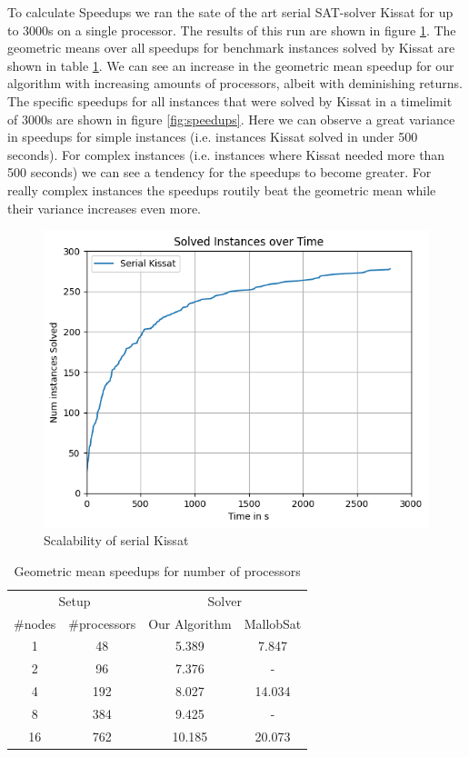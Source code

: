 \documentclass[12pt,a4paper,twoside]{scrartcl}
\numberwithin{equation}{section}
\begin{document}
To calculate Speedups we ran the sate of the art serial SAT-solver Kissat for up to 3000s on a single processor. The results of this run are shown in figure \ref{fig:runtimeSerial}. The geometric means over all speedups for benchmark instances solved by Kissat are shown in table \ref{tab:speedups}. We can see an increase in the geometric mean speedup for our algorithm with increasing amounts of processors, albeit with deminishing returns. The specific speedups for all instances that were solved by Kissat in a timelimit of 3000s are shown in figure \ref{fig:speedups}. Here we can observe a great variance in speedups for simple instances (i.e. instances Kissat solved in under 500 seconds). For complex instances (i.e. instances where Kissat needed more than 500 seconds) we can see a tendency for the speedups to become greater. For really complex instances the speedups routily beat the geometric mean while their variance increases even more.

\begin{figure}
  \center
  \includegraphics{plots/cumulative_runtime/runtime_serial.png}
  \caption{Scalability of serial Kissat}
  \label{fig:runtimeSerial}
\end{figure}

\begin{table}
  \center
  \begin{tabular}{ cccc }
    \toprule
    \multicolumn{2}{c}{Setup} & \multicolumn{2}{c}{Solver}\\
    \#nodes   & \#processors   & Our Algorithm  & MallobSat \\
    \midrule
    1  & 48  & 5.389  & 7.847\\
    2  & 96  & 7.376   & -\\
    4  & 192 & 8.027   & 14.034\\
    8  & 384 & 9.425    & -\\
    16 & 762 & 10.185   & 20.073\\
    \bottomrule
  \end{tabular}
  \caption{Geometric mean speedups for number of processors}
  \label{tab:speedups}
\end{table}
\end{document}
